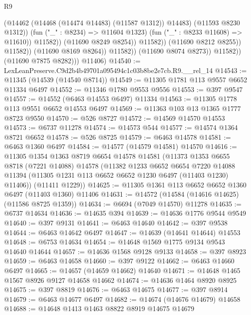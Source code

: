 \begin{lexlean}{R9}
\begin{coremodule}
                                          (@14462 (@14468 (@14474 @14483) (@11587 @1312)) @14483)
                                          (@11593 @8230 @1312))
                                        (fun ("_" : @8234) => @11604 @1323)
                                        (fun ("_" : @8233 @11608) => @11610))
                                      @11582))
                                  (@11690 @8249 @8254))
                                @11582))
                            (@11690 @8212 @8255))
                          @11582))
                      (@11690 @8169 @8264))
                    @11582))
                (@11690 @8074 @8273))
              @11582))
          (@11690 @7875 @8282)))
      @11406)
@14540 := LexLeanPreserve.C9d2b4b49701a095494c1c03b8be2e7cb.R9.__rel_14
@14543 := @11345 (@14539 (@14540 @8714))
@14549 := @11305 @1781 @113 @9557 @6652 @11334 @6497
@14552 := @11346 @1780 @9553 @9556
@14553 := @397 @9547
@14557 := @14552 (@6463 @14553 @6497) @11334
@14563 := @11305 @1778 @113 @9551 @6652 @14553 @6497
@14569 := @11363 @103 @13 @1365 @1777 @8723 @9550
@14570 := @526 @8727
@14572 := @14569 @14570 @14553
@14573 := @6737 @11278
@14574 := @14573 @544
@14577 := @14574 @1364 @8721 @6652
@14578 := @526 @8725
@14579 := @6463 @14578
@14581 := @6463 @1360 @6497
@14584 := @14577 (@14579 @14581) @14570
@14616 := @11305
    @1354
    @1363
    @8719
    @6654
    @14578
    @14581
    (@11373
      @1353
      @6655
      @8718
      (@7221 @14088)
      @14578
      (@11382
        @1233
        @6652
        @6654
        @7220
        @14088
        @11394
        (@11305 @1231 @113 @6652 @6652 @1230 @6497 (@11403 @1230) @11406))
      (@11411 @1229))
@14625 := @11305 @1361 @113 @6652 @6652 @1360 @6497 (@11403 @1360) @11406
@14631 := @14572 (@14584 (@14616 @14625) (@11586 @8725 @1359))
@14634 := @6694 (@7049 @14570) @11278
@14635 := @6737 @14634
@14636 := @14635 @394
@14639 := @14636 @1776 @9544 @9549
@14640 := @397 @9131
@14641 := @6463 @14640
@14642 := @397 @9538
@14644 := @6463 @14642 @6497
@14647 := @14639 (@14641 @14644) @14553
@14648 := @6753 @14634
@14654 := @14648 @1569 @1775 @9134 @9543 @14640 @14644
@14657 := @14636 @1568 @9128 @9133
@14658 := @397 @8923
@14659 := @6463 @14658
@14660 := @397 @9122
@14662 := @6463 @14660 @6497
@14665 := @14657 (@14659 @14662) @14640
@14671 := @14648 @1465 @1567 @8926 @9127 @14658 @14662
@14674 := @14636 @1464 @8920 @8925
@14675 := @397 @8819
@14676 := @6463 @14675
@14677 := @397 @8914
@14679 := @6463 @14677 @6497
@14682 := @14674 (@14676 @14679) @14658
@14688 := @14648 @1413 @1463 @8822 @8919 @14675 @14679

\end{coremodule}
\end{lexlean}

